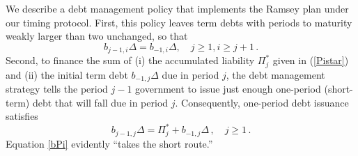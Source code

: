 \documentclass[12pt]{article}
\newtheorem{lemma}[theorem]{Lemma}
\newcommand{\WJ}[1]{{\textcolor{red}{#1}}}
\begin{document}



We  describe  a debt management policy that implements
the Ramsey plan under our timing protocol. First,  
this policy  leaves  term debts with periods to maturity weakly larger than two unchanged, so that  %
\begin{equation}\label{btermuntouched} 
b_{j-1, i}\Delta =b_{-1, i}\Delta, \quad j\geq 1, i\geq j+1\,.
\end{equation}
%
%
%
%
Second, to finance the sum of (i) the accumulated liability $\Pi_j^*$ given in (\ref{Pistar}) and (ii) the initial term debt $b_{-1, j}\Delta$ due in period $j$, the debt management strategy tells the   period $j-1$ government to  issue just enough  one-period (short-term) debt that will fall due  in period $j$. Consequently, one-period debt issuance satisfies
\begin{equation} \label{bPi}
b_{j-1, j}\Delta = \Pi_j^*+b_{-1, j}\Delta\,, \quad j\geq 1\, . 
\end{equation}
Equation \eqref{bPi}  evidently ``takes the short route.''
\end{document}
